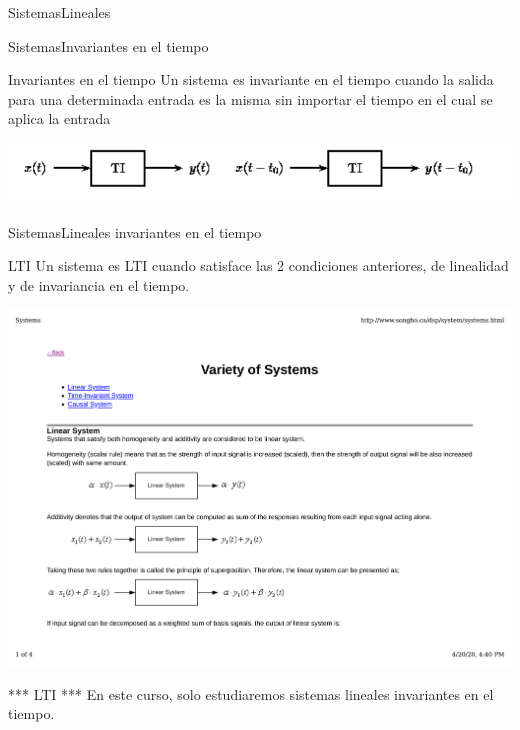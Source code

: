 \begin{darkframes}
\begin{frame}{Sistemas}{Lineales}
         \vfill
      \end{frame}
      \begin{frame}{Sistemas}{Invariantes en el tiempo}
         \begin{block}{Invariantes en el tiempo}
            Un sistema es invariante en el tiempo cuando la salida para una determinada entrada es la misma sin importar el tiempo en el cual se aplica la entrada
         \end{block}
         \center\includegraphics[width=1\textwidth]{1_clase/invariante_en_tiempo}
         \vfill
      \end{frame}
      \begin{frame}{Sistemas}{Lineales invariantes en el tiempo}
         \begin{block}{LTI}
            Un sistema es LTI cuando satisface las 2 condiciones anteriores, de linealidad y de invariancia en el tiempo.
         \end{block}
         \center\includegraphics[width=1\textwidth]{1_clase/lti}
         \vfill
         \begin{alertblock}{*** LTI ***}
            En este curso, \alert{solo} estudiaremos sistemas lineales invariantes en el tiempo.
         \end{alertblock}
      \end{frame}

\end{darkframes}
